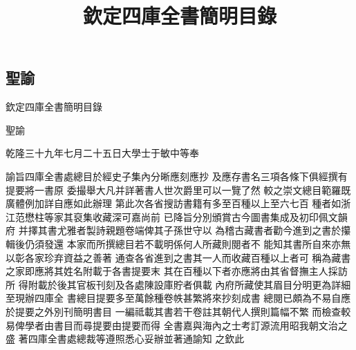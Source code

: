 \documentclass[四库全书文渊阁本]{ltc-guji}
\title{欽定四庫全書簡明目錄}
\begin{document}
\begin{封面}[底色={231, 198, 83}]
\end{封面}

\begin{空白页}
\end{空白页}

\begin{正文}
\chapter{聖諭}
欽定四庫全書簡明目錄

聖諭

\begin{段落}[indent=2]
乾隆三十九年七月二十五日大學士于敏中等奉
\end{段落}

\begin{段落}[indent=1, first-indent=0]
諭旨四庫全書處總目於經史子集內分晰應刻應抄%
及應存書名三項各條下俱經撰有提要將一書原%
委撮舉大凡并詳著書人世次爵里可以一覽了然%
較之崇文總目範羅既廣體例加詳自應如此辦理%
第此次各省搜訪書籍有多至百種以上至六七百%
種者如浙江范懋柱等家其裒集收藏深可嘉尚前%
已降旨分別頒賞古今圖書集成及初印佩文韻府%
并擇其書尤雅者製詩親題卷端俾其子孫世守以%
為稽古藏書者勸今進到之書於攥輯後仍須發還%
本家而所撰總目若不載明係何人所藏則閱者不%
能知其書所自來亦無以彰各家珍弃資益之善著%
通查各省進到之書其一人而收藏百種以上者可%
稱為藏書之家即應將其姓名附載于各書提要末%
其在百種以下者亦應將由其省督撫主人採訪所%
得附載於後其官板刊刻及各處陳設庫貯者俱載%
內府所藏使其眉目分明更為詳細至現辦四庫全%
書總目提要多至萬餘種卷帙甚繁將來抄刻成書%
總閱已頗為不易自應於提要之外別刊簡明書目%
一編祗載其書若干卷註其朝代人撰則篇幅不繁%
而檢查較易俾學者由書目而尋提要由提要而得%
全書嘉與海內之士考訂源流用昭我朝文治之盛%
著四庫全書處總裁等遵照悉心妥辦並著通諭知%
之欽此
\end{段落}

\end{正文}
\end{document}
